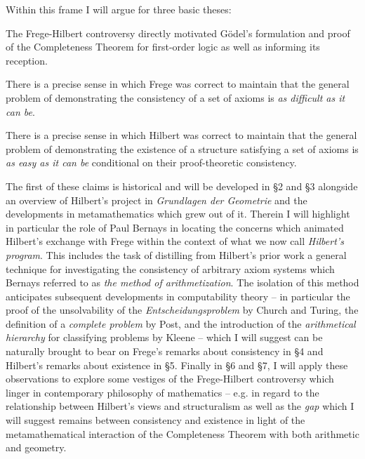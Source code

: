 \documentclass[11pt,fleqn,leqno]{article}
\begin{document}

Within this frame I will argue for three basic theses:
\begin{example}
\label{points}
\begin{compactenum}[i)]
\item The Frege-Hilbert controversy directly motivated G\"odel's formulation and proof of the Completeness Theorem for first-order logic as well as informing its reception.
\item There is a precise sense in which Frege was correct to maintain that the general problem of demonstrating the consistency of a set of axioms is \textsl{as difficult as it can be}.
\item There is a precise sense in which Hilbert was correct to maintain that the general problem of demonstrating the existence of a structure satisfying a set of axioms is \textsl{as easy as it can be} conditional on their proof-theoretic consistency.
\end{compactenum}
\end{example}

The first of these claims is historical and will be developed in \S 2 and \S 3 alongside an overview of Hilbert's project in  \textsl{Grundlagen der Geometrie} and the developments in metamathematics which grew out of it.  Therein I will highlight in particular the role of Paul Bernays in locating the concerns which animated Hilbert's exchange with Frege within the context of what we now call \textsl{Hilbert's program}.  This includes the task of distilling from Hilbert's prior work a general technique for investigating the consistency of arbitrary axiom systems which Bernays referred to as \textsl{the method of arithmetization}.   The isolation of this method anticipates subsequent developments in computability theory -- in particular the proof of the unsolvability of the \textsl{Entscheidungsproblem} by Church and Turing, the definition of a \textsl{complete problem} by Post, and the introduction of the \textsl{arithmetical hierarchy} for classifying problems by Kleene -- which I will suggest can be naturally brought to bear on Frege's remarks about consistency in \S4 and Hilbert's remarks about existence in \S5. Finally in \S 6 and \S 7, I will apply these observations to explore some vestiges of the Frege-Hilbert controversy which linger in contemporary philosophy of mathematics -- e.g. in regard to the relationship between Hilbert's views and structuralism as well as the \textsl{gap} which I will suggest remains between consistency and existence in light of the metamathematical interaction of the Completeness Theorem with both arithmetic and geometry.   
\end{document}
